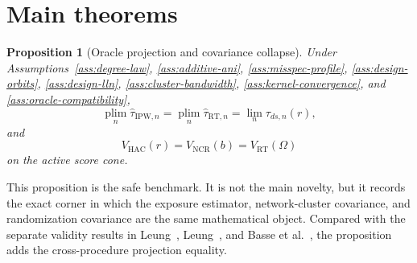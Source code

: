 \documentclass[11pt]{article}
\newcommand{\plim}{\operatorname*{plim}}
\theoremstyle{definition}
\theoremstyle{plain}
\newtheorem{proposition}{Proposition}
\theoremstyle{remark}
\begin{document}
\section{Main theorems}
\begin{proposition}[Oracle projection and covariance collapse]\label{prop:oracle-collapse}
Under Assumptions~\ref{ass:degree-law}, \ref{ass:additive-ani},
\ref{ass:misspec-profile}, \ref{ass:design-orbits}, \ref{ass:design-lln},
\ref{ass:cluster-bandwidth}, \ref{ass:kernel-convergence}, and
\ref{ass:oracle-compatibility},
\[
  \plim_n \hat\tau_{\mathrm{IPW},n}
  =
  \plim_n \hat\tau_{\mathrm{RT},n}
  =
  \lim_n \tau_{ds,n}(r),
\]
and
\[
  V_{\mathrm{HAC}}(r)
  =
  V_{\mathrm{NCR}}(b)
  =
  V_{\mathrm{RT}}(\Omega)
\]
on the active score cone.
\end{proposition}

This proposition is the safe benchmark.  It is not the main novelty, but it
records the exact corner in which the exposure estimator, network-cluster
covariance, and randomization covariance are the same mathematical object.
Compared with the separate validity results in Leung~\cite{Leung2022ANI},
Leung~\cite{Leung2023NCRI}, and Basse et al.~\cite{BasseDingFellerToulis2024},
the proposition adds the cross-procedure projection equality.
\end{document}
